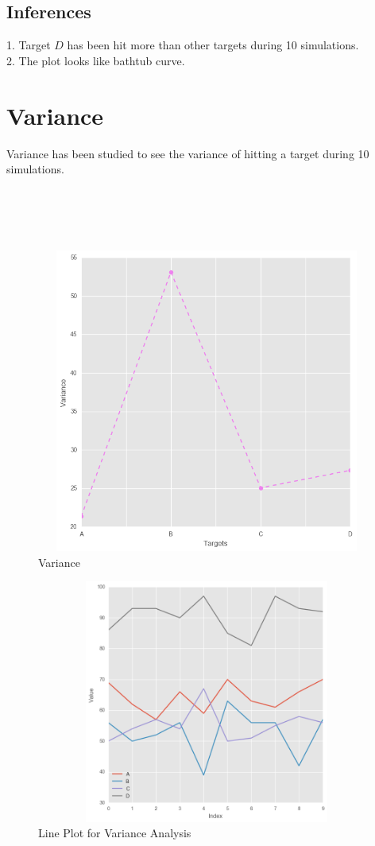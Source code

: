 \documentclass[11pt]{report}
\begin{document}
\subsection{Inferences}
1. Target $D$ has been hit more than other targets during 10 simulations.\\ 
2. The plot looks like bathtub curve.

\section{Variance}
Variance has been studied to see the variance of hitting a target during 10 simulations.\\
\\
\\
\\
\\
\begin{figure}[h!]
  \centering
  \includegraphics[height = 10cm, width = 14cm]{variance.png}
  \caption{Variance}
  \label{fig:variance}
\end{figure}

\begin{figure}[h!]
  \centering
  \includegraphics[height = 8cm, width = 14cm]{lineplot.png}
  \caption{Line Plot for Variance Analysis}
  \label{fig:lineplot}
\end{figure}
\end{document}
